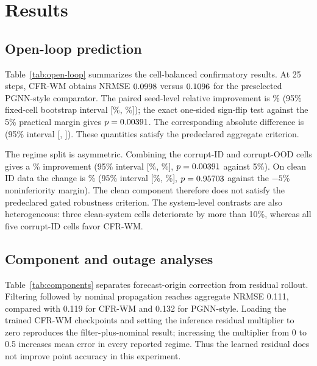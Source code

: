 \section{Results}

\subsection{Open-loop prediction}

Table~\ref{tab:open-loop} summarizes the cell-balanced confirmatory results.
At 25 steps, CFR-WM obtains NRMSE $0.0998$ versus $0.1096$ for the
preselected PGNN-style comparator. The paired seed-level relative improvement
is \PrimaryImprovement\% (95\% fixed-cell bootstrap interval
[\PrimaryRelativeCILow\%, \PrimaryRelativeCIHigh\%]); the exact one-sided
sign-flip test against the 5\% practical margin gives
$p=0.00391$. The corresponding absolute difference is
\PrimaryDifference{} (95\% interval [\PrimaryCILow,
\PrimaryCIHigh]). These quantities satisfy the predeclared aggregate
criterion.

\begin{table}[!t]
  \caption{Open-loop prediction over five systems, three regimes, and eight
  paired seeds. Entries are mean $\pm$ SD across seed-level cell-balanced
  aggregates.}
  \label{tab:open-loop}
  \centering
  \footnotesize
  
\end{table}

The regime split is asymmetric. Combining the corrupt-ID and corrupt-OOD
cells gives a \CorruptImprovement\% improvement (95\% interval
[\CorruptRelativeCILow\%, \CorruptRelativeCIHigh\%],
$p=0.00391$ against 5\%). On clean ID data the change is
\CleanImprovement\% (95\% interval [\CleanRelativeCILow\%,
\CleanRelativeCIHigh\%], $p=0.95703$ against the $-5\%$
noninferiority margin). The clean component therefore does not satisfy the
predeclared gated robustness criterion. The system-level contrasts are also
heterogeneous: three clean-system cells deteriorate by more than 10\%, whereas
all five corrupt-ID cells favor CFR-WM.

\subsection{Component and outage analyses}

Table~\ref{tab:components} separates forecast-origin correction from residual
rollout. Filtering followed by nominal propagation reaches aggregate NRMSE
0.111, compared with 0.119 for CFR-WM and 0.132 for PGNN-style. Loading the
trained CFR-WM checkpoints and setting the inference residual multiplier to
zero reproduces the filter-plus-nominal result; increasing the multiplier from
0 to 0.5 increases mean error in every reported regime. Thus the learned
residual does not improve point accuracy in this experiment.

